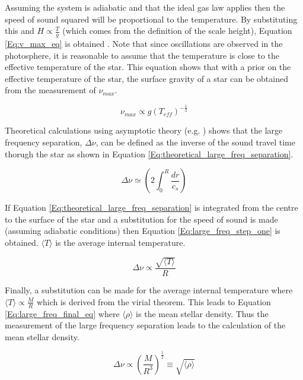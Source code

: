 Assuming the system is adiabatic and that the ideal gas law applies then the speed of sound squared will be proportional to the temperature. By substituting this and $H \propto \frac{T}{g}$ (which comes from the definition of the scale height), Equation \ref{Eq:v_max_eq} is obtained \citep{Kjeldsen_Bedding_1995}. Note that since oscillations are observed in the photosphere, it is reasonable to assume that the temperature is close to the effective temperature of the star. This equation shows that with a prior on the effective temperature of the star, the surface gravity of a star can be obtained from the measurement of $\nu_{max}$.

\begin{equation}
    \nu_{max} \propto g(T_{eff})^{-\frac{1}{2}}
    \label{Eq:v_max_eq}
\end{equation}

Theoretical calculations using asymptotic theory (e.g. \citealt{Christensen_Dalsgaard_1988}) shows that the large frequency separation, $\Delta\nu$, can be defined as the inverse of the sound travel time thorugh the star as shown in Equation \ref{Eq:theoretical_large_freq_separation}.

\begin{equation}
    \Delta\nu \simeq \left(2 \int_{0}^{R} \frac{dr}{c_{s}} \right)
    \label{Eq:theoretical_large_freq_separation}
\end{equation}

If Equation \ref{Eq:theoretical_large_freq_separation} is integrated from the centre to the surface of the star and a substitution for the speed of sound is made (assuming adiabatic conditions) then Equation \ref{Eq:large_freq_step_one} is obtained. $\langle T \rangle$ is the average internal temperature.

\begin{equation}
    \Delta\nu \propto \frac{\sqrt{\langle T \rangle}}{R}
    \label{Eq:large_freq_step_one}
\end{equation}

Finally, a substitution can be made for the average internal temperature where $\langle T \rangle \propto \frac{M}{R}$ which is derived from the virial theorem. This leads to Equation \ref{Eq:large_freq_final_eq} where $\langle \rho \rangle$ is the mean stellar density. Thus the measurement of the large frequency separation leads to the calculation of the mean stellar density.

\begin{equation}
    \Delta\nu \propto \left(\frac{M}{R^{3}} \right)^{\frac{1}{2}} \equiv \sqrt{\langle \rho \rangle}
    \label{Eq:large_freq_final_eq}
\end{equation}

